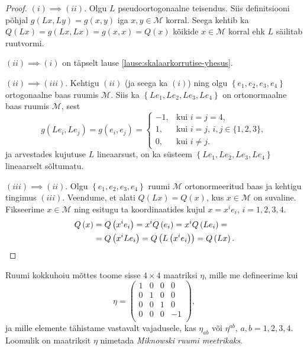 \documentclass[12pt,a4paper,oneside]{article}
\theoremstyle{plain}
\theoremstyle{definition}
\numberwithin{equation}{section}
\def\M{{\mathcal M}}
\begin{document}
\begin{proof}
$(i) \implies (ii)$. Olgu $L$ pseudoortogonaalne teisendus. Siis 
definitsiooni põhjal $g\left(Lx, Ly\right) = g\left(x, y\right)$ iga 
$x, y \in \M$ korral. Seega kehtib ka $Q\left(Lx\right) = 
g\left(Lx, Lx\right) = g\left(x, x\right) = Q\left(x\right)$ 
kõikide $x \in \M$ korral ehk $L$ säilitab ruutvormi.

$(ii) \implies (i)$ on täpselt lause 
\ref{lause:skalaarkorrutise-yhesus}.

$(ii) \implies (iii)$. Kehtigu $(ii)$ (ja seega ka $(i)$) ning 
olgu $\left\lbrace e_1, e_2, e_3, e_4 \right\rbrace$ ortogonaalne 
baas ruumis $\M$. Siis ka $\left\lbrace Le_1, Le_2, Le_3, Le_4 
\right\rbrace$ on ortonormaalne baas ruumis $\M$, sest
\begin{equation*}
g \left(Le_i, Le_j\right) = g\left(e_i, e_j\right) = \begin{cases}
    -1,& \text{kui $i = j = 4$},\\
    1,& \text{kui $i = j$, $i,j \in \{1, 2, 3\}$},\\
    0,& \text{kui $i \neq j$}.
  \end{cases}
\end{equation*}
ja arvestades kujutuse $L$ lineaarsust, on ka süsteem 
$\left\lbrace Le_1, Le_2, Le_3, Le_4 \right\rbrace$ lineaarselt 
sõltumatu.

$(iii) \implies (ii)$. Olgu $\left\lbrace e_1, e_2, e_3, e_4 
\right\rbrace$ ruumi $\M$ ortonormeeritud baas ja kehtigu tingimus 
$(iii)$. Veendume, et alati $Q\left(Lx\right) = Q\left(x\right)$, 
kus $x \in \M$ on suvaline. Fikseerime $x \in \M$ ning esitugu ta 
koordinaatides kujul $x = x^i e_i$, $i = 1, 2, 3, 4$.
\begin{align*}
Q\left(x\right) &= Q\left(x^i e_i\right) = x^i Q\left(e_i\right) = 
x^i Q\left(Le_i\right) = \\
&= Q\left(x^i L e_i\right) = Q\left(L\left(x^i e_i\right)\right) = 
Q\left(Lx\right). \qedhere
\end{align*}
\end{proof}
%
Ruumi kokkuhoiu mõttes toome sisse $4 \times 4$ maatriksi $\eta$, 
mille me defineerime kui
\begin{equation*}
\eta = \begin{pmatrix}
1 & 0 & 0 & 0 \\ 
0 & 1 & 0 & 0 \\  
0 & 0 & 1 & 0 \\ 
0 & 0 & 0 & -1 \\ 
\end{pmatrix},
\end{equation*}
ja mille elemente tähistame vastavalt vajadusele, kas $\eta_{ab}$ või 
$\eta^{ab}$, $a, b = 1, 2, 3, 4$. Loomulik on maatriksit $\eta$ 
nimetada \emph{Miknowski ruumi meetrikaks}.
\end{document}

